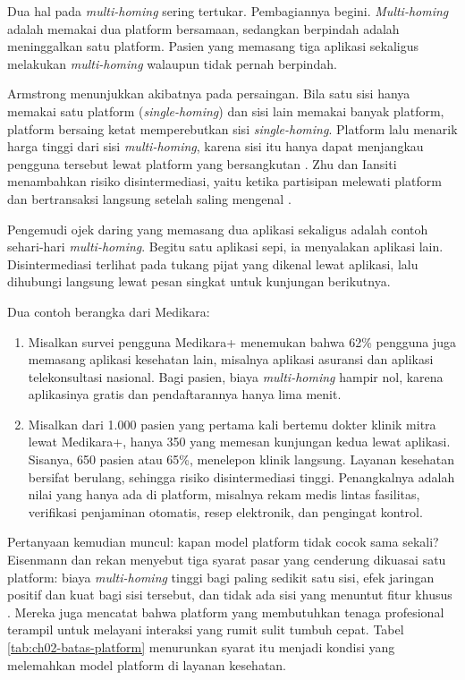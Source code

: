 Dua hal pada \textit{multi-homing} sering tertukar. Pembagiannya begini.
\textit{Multi-homing} adalah memakai dua platform bersamaan, sedangkan
berpindah adalah meninggalkan satu platform. Pasien yang memasang tiga aplikasi
sekaligus melakukan \textit{multi-homing} walaupun tidak pernah berpindah.

Armstrong menunjukkan akibatnya pada persaingan. Bila satu sisi hanya memakai
satu platform (\textit{single-homing}) dan sisi lain memakai banyak platform,
platform bersaing ketat memperebutkan sisi \textit{single-homing}. Platform lalu
menarik harga tinggi dari sisi \textit{multi-homing}, karena sisi itu hanya
dapat menjangkau pengguna tersebut lewat platform yang bersangkutan
\cite{armstrong2006competition}. Zhu dan Iansiti menambahkan risiko
disintermediasi, yaitu ketika partisipan melewati platform dan bertransaksi
langsung setelah saling mengenal \cite{c02-zhu2019platforms}.

Pengemudi ojek daring yang memasang dua aplikasi sekaligus adalah contoh
sehari-hari \textit{multi-homing}. Begitu satu aplikasi sepi, ia menyalakan
aplikasi lain. Disintermediasi terlihat pada tukang pijat yang dikenal lewat
aplikasi, lalu dihubungi langsung lewat pesan singkat untuk kunjungan
berikutnya.

Dua contoh berangka dari Medikara:
\begin{enumerate}
  \item Misalkan survei pengguna Medikara+ menemukan bahwa 62\% pengguna juga
        memasang aplikasi kesehatan lain, misalnya aplikasi asuransi dan
        aplikasi telekonsultasi nasional. Bagi pasien, biaya
        \textit{multi-homing} hampir nol, karena aplikasinya gratis dan
        pendaftarannya hanya lima menit.
  \item Misalkan dari 1.000 pasien yang pertama kali bertemu dokter klinik
        mitra lewat Medikara+, hanya 350 yang memesan kunjungan kedua lewat
        aplikasi. Sisanya, 650 pasien atau 65\%, menelepon klinik langsung.
        Layanan kesehatan bersifat berulang, sehingga risiko disintermediasi
        tinggi. Penangkalnya adalah nilai yang hanya ada di platform, misalnya
        rekam medis lintas fasilitas, verifikasi penjaminan otomatis, resep
        elektronik, dan pengingat kontrol.
\end{enumerate}

Pertanyaan kemudian muncul: kapan model platform tidak cocok sama sekali?
Eisenmann dan rekan menyebut tiga syarat pasar yang cenderung dikuasai satu
platform: biaya \textit{multi-homing} tinggi bagi paling sedikit satu sisi,
efek jaringan positif dan kuat bagi sisi tersebut, dan tidak ada sisi yang
menuntut fitur khusus \cite{eisenmann2006strategies}. Mereka juga
mencatat bahwa platform yang membutuhkan tenaga profesional terampil untuk
melayani interaksi yang rumit sulit tumbuh cepat. Tabel
\ref{tab:ch02-batas-platform} menurunkan syarat itu menjadi kondisi yang
melemahkan model platform di layanan kesehatan.

